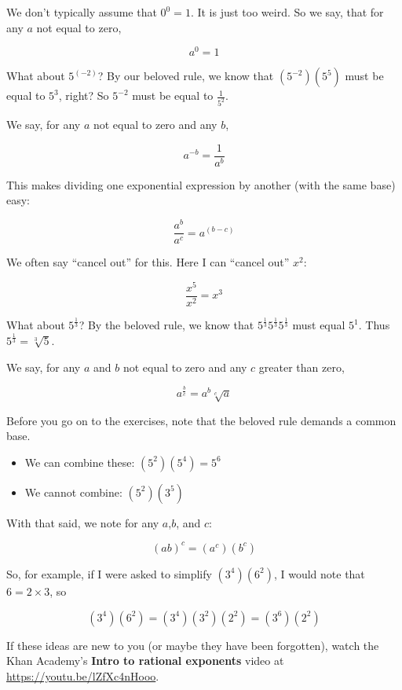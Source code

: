 We don't typically assume that $0^0 = 1$. It is just too
weird. So we say, that for any $a$ not equal to zero,

$$a^0 = 1$$

What about $5^{(-2)}$?  By our beloved rule, we know that
$\left(5^{-2}\right)\left(5^5\right)$ must be equal to $5^3$, right?
So $5^{-2}$ must be equal to $\frac{1}{5^2}$.

We say, for any $a$ not equal to zero and any $b$,

$$a^{-b} = \frac{1}{a^{b}}$$

This makes dividing one exponential expression by another (with the same base) easy:

$$\frac{a^b}{a^c} = a^{(b-c)}$$

We often say ``cancel out'' for this. Here I can ``cancel out'' $x^2$:

$$\frac{x^5}{x^2} = x^3$$

What about $5^{\frac{1}{3}}$? By the beloved rule, we know that $5^{\frac{1}{3}}5^{\frac{1}{3}}5^{\frac{1}{3}}$ must equal $5^1$. Thus $5^{\frac{1}{3}} = \sqrt[3]{5}$.

We say, for any $a$ and $b$ not equal to zero and any $c$ greater than zero,

$$a^{\frac{b}{c}} = a^b \sqrt[c]{a}$$

Before you go on to the exercises, note that the beloved rule demands a common base.
\begin{itemize}
\item We can combine these: $\left(5^2\right)\left(5^4\right) = 5^6$
\item We cannot combine: $\left(5^2\right)\left(3^5\right)$
\end{itemize}

With that said, we note for any $a$,$b$, and $c$:

$$\left(ab\right)^c = \left(a^c\right) \left(b^c\right)$$

So, for example, if I were asked to simplify
$\left(3^4\right)\left(6^2\right)$, I would note that $6 = 2 \times
3$, so

$$\left(3^4\right)\left(6^2\right) = \left(3^4\right)\left(3^2\right)\left(2^2\right)  = \left(3^6\right)\left(2^2\right)$$


If these ideas are new to you (or maybe they have been forgotten),
watch the Khan Academy's \textbf{Intro to rational exponents} video at
\url{https://youtu.be/lZfXc4nHooo}.

